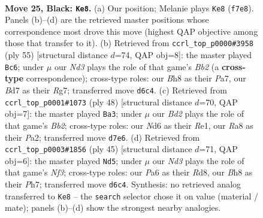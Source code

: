 \documentclass[11pt]{article}
\begin{document}
\clearpage

\begin{figure}[p]\centering
\begin{subfigure}{0.46\textwidth}\centering
\resizebox{\linewidth}{!}{%
\newchessgame
\chessboard[
  setfen={r4r1b/1ppb1k2/p2n4/4pp1R/8/PBN2N2/1P2KPP1/R1B5 b - - 2 25},
  showmover=false,
  pgfstyle=straightmove, color=movearrow, markmove={f7-e8}
]}
\caption{}
\end{subfigure}\hfill
\begin{subfigure}{0.46\textwidth}\centering
\resizebox{\linewidth}{!}{%
\newchessgame
\chessboard[
  setfen={3r4/pbk2prp/1p6/2pn3R/2B1N3/1P3P2/P1P5/2K1R3 b - - 0 28},
  showmover=false,
  pgfstyle=straightmove, color=movearrow, markmove={b7-c6}
]}
\caption{}
\end{subfigure}
\\[4pt]
\begin{subfigure}{0.46\textwidth}\centering
\resizebox{\linewidth}{!}{%
\newchessgame
\chessboard[
  setfen={2r3k1/p3p2p/b3p1p1/4N3/2P5/7P/PB1rnPP1/R3R2K w - - 3 25},
  showmover=false,
  pgfstyle=straightmove, color=movearrow, markmove={b2-a3}
]}
\caption{}
\end{subfigure}\hfill
\begin{subfigure}{0.46\textwidth}\centering
\resizebox{\linewidth}{!}{%
\newchessgame
\chessboard[
  setfen={r2r2k1/1p2bp1p/5np1/4N3/1P6/4P2P/bRB1NPP1/2R3K1 b - - 2 23},
  showmover=false,
  pgfstyle=straightmove, color=movearrow, markmove={f6-d5}
]}
\caption{}
\end{subfigure}
\caption{\textbf{Move 25, Black: \texttt{Ke8}.} (a) Our position; Melanie plays \texttt{Ke8} (\texttt{f7e8}). Panels (b)--(d) are the retrieved master positions whose correspondence most drove this move (highest QAP objective among those that transfer to it). (b) Retrieved from \texttt{ccrl\_top\_p0000\#3958} (ply 55) [structural distance $d$=74, QAP obj=8]: the master played \texttt{Bc6}; under $\mu$ our \emph{Nd3} plays the role of that game's \emph{Bb2} (a \textbf{cross-type} correspondence); cross-type roles: our \emph{B}h8 as their \emph{P}a7, our \emph{B}d7 as their \emph{R}g7; transferred move \texttt{d6c4}. (c) Retrieved from \texttt{ccrl\_top\_p0001\#1073} (ply 48) [structural distance $d$=70, QAP obj=7]: the master played \texttt{Ba3}; under $\mu$ our \emph{Bd2} plays the role of that game's \emph{Bb2}; cross-type roles: our \emph{N}d6 as their \emph{R}e1, our \emph{R}a8 as their \emph{P}a2; transferred move \texttt{d7e6}. (d) Retrieved from \texttt{ccrl\_top\_p0003\#1856} (ply 45) [structural distance $d$=71, QAP obj=6]: the master played \texttt{Nd5}; under $\mu$ our \emph{Nd3} plays the role of that game's \emph{Nf3}; cross-type roles: our \emph{P}a6 as their \emph{R}d8, our \emph{B}h8 as their \emph{P}h7; transferred move \texttt{d6c4}. Synthesis: no retrieved analog transferred to \texttt{Ke8} -- the \texttt{search} selector chose it on value (material / mate); panels (b)--(d) show the strongest nearby analogies.}
\label{fig:thought-m49}
\end{figure}
\end{document}
